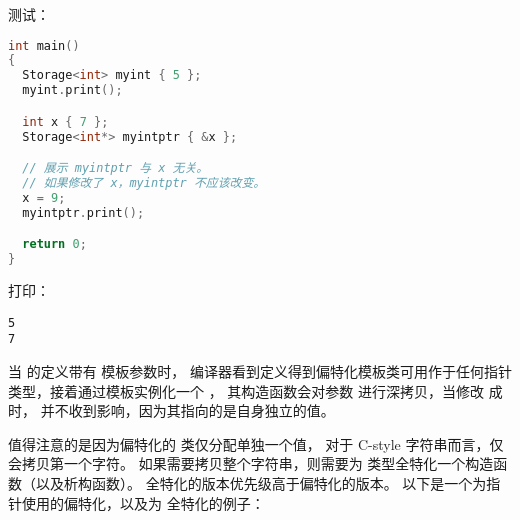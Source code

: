\documentclass[../../LearnCpp.tex]{subfiles}
\begin{document}
测试：

\begin{lstlisting}[language=C++]
int main()
{
  Storage<int> myint { 5 };
  myint.print();

  int x { 7 };
  Storage<int*> myintptr { &x };

  // 展示 myintptr 与 x 无关。
  // 如果修改了 x，myintptr 不应该改变。
  x = 9;
  myintptr.print();

  return 0;
}
\end{lstlisting}

打印：

\begin{lstlisting}
5
7
\end{lstlisting}

当  的定义带有  模板参数时，
编译器看到定义得到偏特化模板类可用作于任何指针类型，接着通过模板实例化一个 ，
其构造函数会对参数  进行深拷贝，当修改  成  时，
 并不收到影响，因为其指向的是自身独立的值。

值得注意的是因为偏特化的  类仅分配单独一个值，
对于 C-style 字符串而言，仅会拷贝第一个字符。
如果需要拷贝整个字符串，则需要为  类型全特化一个构造函数（以及析构函数）。
全特化的版本优先级高于偏特化的版本。
以下是一个为指针使用的偏特化，以及为  全特化的例子：
\end{document}
